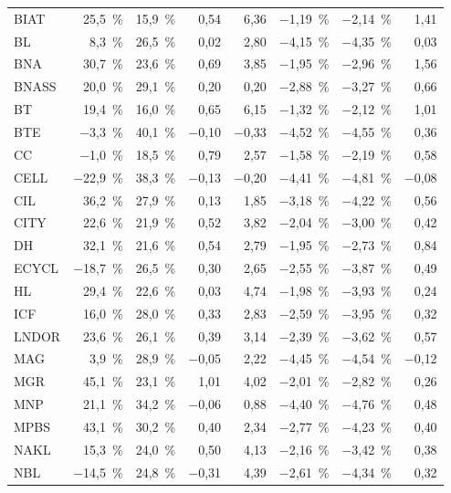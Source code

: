\documentclass[11pt,a4paper]{article}
\begin{document}
{\begin{longtable}{lrrrrrrr}
BIAT & 25{,}5~\% & 15{,}9~\% & 0{,}54 & 6{,}36 & $-$1{,}19~\% & $-$2{,}14~\% & 1{,}41 \\
BL & 8{,}3~\% & 26{,}5~\% & 0{,}02 & 2{,}80 & $-$4{,}15~\% & $-$4{,}35~\% & 0{,}03 \\
BNA & 30{,}7~\% & 23{,}6~\% & 0{,}69 & 3{,}85 & $-$1{,}95~\% & $-$2{,}96~\% & 1{,}56 \\
BNASS & 20{,}0~\% & 29{,}1~\% & 0{,}20 & 0{,}20 & $-$2{,}88~\% & $-$3{,}27~\% & 0{,}66 \\
BT & 19{,}4~\% & 16{,}0~\% & 0{,}65 & 6{,}15 & $-$1{,}32~\% & $-$2{,}12~\% & 1{,}01 \\
BTE & $-$3{,}3~\% & 40{,}1~\% & $-$0{,}10 & $-$0{,}33 & $-$4{,}52~\% & $-$4{,}55~\% & 0{,}36 \\
CC & $-$1{,}0~\% & 18{,}5~\% & 0{,}79 & 2{,}57 & $-$1{,}58~\% & $-$2{,}19~\% & 0{,}58 \\
CELL & $-$22{,}9~\% & 38{,}3~\% & $-$0{,}13 & $-$0{,}20 & $-$4{,}41~\% & $-$4{,}81~\% & $-$0{,}08 \\
CIL & 36{,}2~\% & 27{,}9~\% & 0{,}13 & 1{,}85 & $-$3{,}18~\% & $-$4{,}22~\% & 0{,}56 \\
CITY & 22{,}6~\% & 21{,}9~\% & 0{,}52 & 3{,}82 & $-$2{,}04~\% & $-$3{,}00~\% & 0{,}42 \\
DH & 32{,}1~\% & 21{,}6~\% & 0{,}54 & 2{,}79 & $-$1{,}95~\% & $-$2{,}73~\% & 0{,}84 \\
ECYCL & $-$18{,}7~\% & 26{,}5~\% & 0{,}30 & 2{,}65 & $-$2{,}55~\% & $-$3{,}87~\% & 0{,}49 \\
HL & 29{,}4~\% & 22{,}6~\% & 0{,}03 & 4{,}74 & $-$1{,}98~\% & $-$3{,}93~\% & 0{,}24 \\
ICF & 16{,}0~\% & 28{,}0~\% & 0{,}33 & 2{,}83 & $-$2{,}59~\% & $-$3{,}95~\% & 0{,}32 \\
LNDOR & 23{,}6~\% & 26{,}1~\% & 0{,}39 & 3{,}14 & $-$2{,}39~\% & $-$3{,}62~\% & 0{,}57 \\
MAG & 3{,}9~\% & 28{,}9~\% & $-$0{,}05 & 2{,}22 & $-$4{,}45~\% & $-$4{,}54~\% & $-$0{,}12 \\
MGR & 45{,}1~\% & 23{,}1~\% & 1{,}01 & 4{,}02 & $-$2{,}01~\% & $-$2{,}82~\% & 0{,}26 \\
MNP & 21{,}1~\% & 34{,}2~\% & $-$0{,}06 & 0{,}88 & $-$4{,}40~\% & $-$4{,}76~\% & 0{,}48 \\
MPBS & 43{,}1~\% & 30{,}2~\% & 0{,}40 & 2{,}34 & $-$2{,}77~\% & $-$4{,}23~\% & 0{,}40 \\
NAKL & 15{,}3~\% & 24{,}0~\% & 0{,}50 & 4{,}13 & $-$2{,}16~\% & $-$3{,}42~\% & 0{,}38 \\
NBL & $-$14{,}5~\% & 24{,}8~\% & $-$0{,}31 & 4{,}39 & $-$2{,}61~\% & $-$4{,}34~\% & 0{,}32 \\

\end{longtable}}
\end{document}
